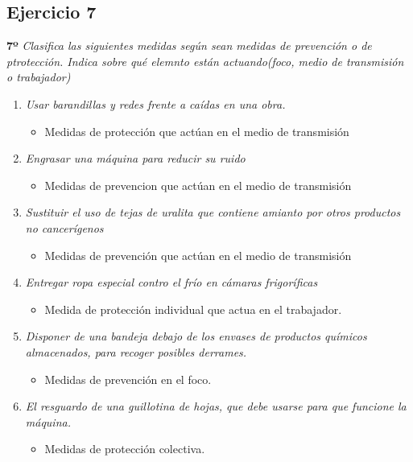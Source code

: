 \documentclass{article}
\begin{document}
      \subsection{Ejercicio 7}
        \textbf{7º} \textit{Clasifica las siguientes medidas según sean medidas de prevención o de ptrotección. Indica sobre qué elemnto están actuando(foco, medio de transmisión o trabajador)}
        \\
        \begin{enumerate}[label=(\alph*)]
          \item \textit{Usar barandillas y redes frente a caídas en una obra.}
            \begin{itemize}
              \item Medidas de protección que actúan en el medio de transmisión
            \end{itemize}
          \item \textit{Engrasar una máquina para reducir su ruido}
            \begin{itemize}
              \item Medidas de prevencion que actúan en el medio de transmisión
            \end{itemize}
          \item \textit{Sustituir el uso de tejas de uralita que contiene amianto por otros productos no cancerígenos}
            \begin{itemize}
              \item Medidas de prevención que actúan en el medio de transmisión
            \end{itemize}
          \item \textit{Entregar ropa especial contro el frío en cámaras frigoríficas}
            \begin{itemize}
              \item Medida de protección individual que actua en el trabajador.
            \end{itemize}
          \item \textit{Disponer de una bandeja debajo de los envases de productos químicos almacenados, para recoger posibles derrames.}
            \begin{itemize}
              \item Medidas de prevención en el foco.
            \end{itemize}
          \item \textit{El resguardo de una guillotina de hojas, que debe usarse para que funcione la máquina.}
            \begin{itemize}
              \item Medidas de protección colectiva.
            \end{itemize}
        \end{enumerate}
\end{document}
